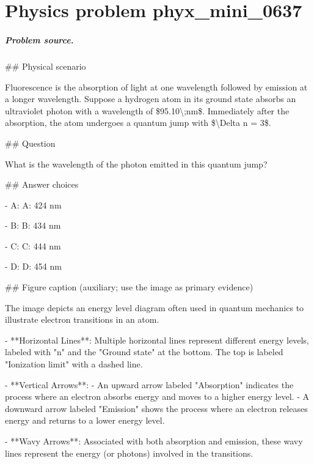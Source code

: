
\chapter{Physics problem phyx\_mini\_0637}
\label{ch:PhyXMiniProblems_problem_phyx_mini_0637}

\paragraph{Problem source.}
\#\# Physical scenario

Fluorescence is the absorption of light at one wavelength followed by emission at a longer wavelength. Suppose a hydrogen atom in its ground state absorbs an ultraviolet photon with a wavelength of \$95.10\textbackslash{};nm\$. Immediately after the absorption, the atom undergoes a quantum jump with \$\textbackslash{}Delta n = 3\$.

\#\# Question

What is the wavelength of the photon emitted in this quantum jump?

\#\# Answer choices

- A: A: 424 nm

- B: B: 434 nm

- C: C: 444 nm

- D: D: 454 nm

\#\# Figure caption (auxiliary; use the image as primary evidence)

The image depicts an energy level diagram often used in quantum mechanics to illustrate electron transitions in an atom. 

- **Horizontal Lines**: Multiple horizontal lines represent different energy levels, labeled with "n" and the "Ground state" at the bottom. The top is labeled "Ionization limit" with a dashed line.
  
- **Vertical Arrows**: 
  - An upward arrow labeled "Absorption" indicates the process where an electron absorbs energy and moves to a higher energy level.
  - A downward arrow labeled "Emission" shows the process where an electron releases energy and returns to a lower energy level.

- **Wavy Arrows**: Associated with both absorption and emission, these wavy lines represent the energy (or photons) involved in the transitions.

